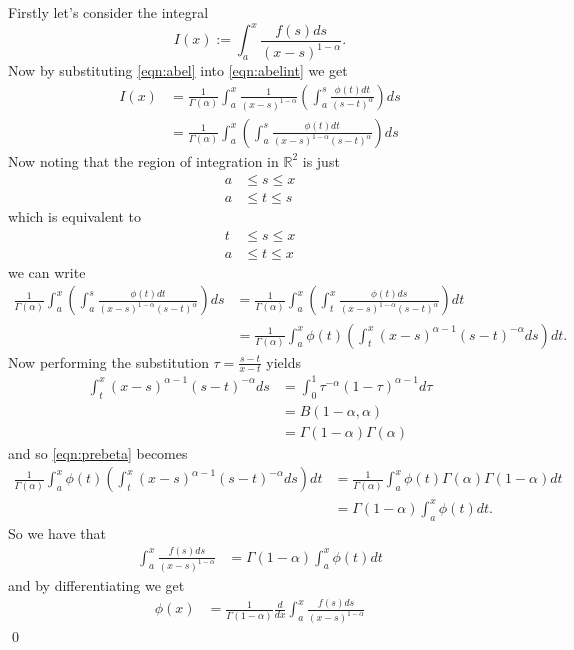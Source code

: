 \documentclass{unswmaths}
\begin{document}
Firstly let's consider the integral 
\begin{equation}
	\label{eqn:abelint}
	I(x) := \int_a^x \frac{f(s)ds}{(x-s)^{1-\alpha}}.
\end{equation}
Now by substituting \eqref{eqn:abel} into \eqref{eqn:abelint} we get 
\begin{align*}
	I(x) &= \frac{1}{\Gamma(\alpha)} \int_a^x \frac{1}{(x-s)^{1-\alpha}} \left( \int_a^s \frac{\phi(t)dt}{(s-t)^\alpha} \right) ds \\
		&= \frac{1}{\Gamma(\alpha)} \int_a^x \left( \int_a^s \frac{\phi(t)dt}{(x-s)^{1-\alpha}(s-t)^\alpha} \right) ds
\end{align*}
Now noting that the region of integration in $ \mathbb{R}^2 $ is just
\begin{align*}
	a &\leq s \leq x \\
	a &\leq t \leq s 
\end{align*}
which is equivalent to 
\begin{align*}
	t &\leq s \leq x \\
	a &\leq t \leq x 
\end{align*}
we can write 
\begin{align}
	\frac{1}{\Gamma(\alpha)} \int_a^x \left( \int_a^s \frac{\phi(t)dt}{(x-s)^{1-\alpha}(s-t)^\alpha} \right) ds 
		&= \frac{1}{\Gamma(\alpha)} \int_a^x \left( \int_t^x \frac{\phi(t)ds}{(x-s)^{1-\alpha}(s-t)^\alpha} \right) dt \nonumber \\
		\label{eqn:prebeta}
		&= \frac{1}{\Gamma(\alpha)} \int_a^x \phi(t) \left( \int_t^x (x-s)^{\alpha-1}(s-t)^{-\alpha} ds\right) dt. 
\end{align}
Now performing the substitution $ \tau = \frac{s-t}{x-t} $ yields 
\begin{align*}
	\int_t^x (x-s)^{\alpha-1}(s-t)^{-\alpha} ds &= \int_0^1 \tau^{-\alpha} (1-\tau)^{\alpha - 1} d\tau \\
		&= B(1-\alpha,\alpha) \\
		&= \Gamma(1-\alpha)\Gamma(\alpha)
\end{align*}
and so \eqref{eqn:prebeta} becomes
\begin{align*}
	\frac{1}{\Gamma(\alpha)} \int_a^x \phi(t) \left( \int_t^x (x-s)^{\alpha-1}(s-t)^{-\alpha} ds\right) dt
		&= \frac{1}{\Gamma(\alpha)} \int_a^x \phi(t) \Gamma(\alpha)\Gamma(1-\alpha) dt \\
		&= \Gamma(1-\alpha)\int_a^x \phi(t) dt. 
\end{align*}
So we have that 
\begin{align*}
	\int_a^x \frac{f(s)ds}{(x-s)^{1-\alpha}} &= \Gamma(1-\alpha)\int_a^x \phi(t) dt
\end{align*}
and by differentiating we get
\begin{align*}
	\phi(x) &= \frac{1}{\Gamma(1-\alpha)} \frac{d}{dx} \int_a^x \frac{f(s)ds}{(x-s)^{1-\alpha}}
\end{align*}
\nocite{Samko1993}
\qed
\end{document}
